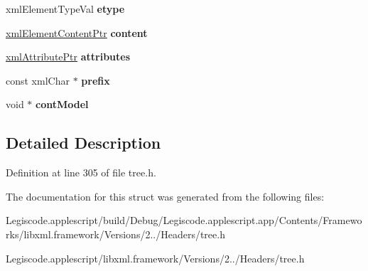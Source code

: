 \begin{DoxyCompactItemize}
\item 
\hypertarget{struct__xml_element_a3f7566085877a63b728c8596438a9540}{xml\-Element\-Type\-Val {\bfseries etype}}\label{struct__xml_element_a3f7566085877a63b728c8596438a9540}

\item 
\hypertarget{struct__xml_element_ac934ce51a0a220c511c1700c3694e0e7}{\hyperlink{struct__xml_element_content}{xml\-Element\-Content\-Ptr} {\bfseries content}}\label{struct__xml_element_ac934ce51a0a220c511c1700c3694e0e7}

\item 
\hypertarget{struct__xml_element_a45468a87059e899da068a6cc04e6a943}{\hyperlink{struct__xml_attribute}{xml\-Attribute\-Ptr} {\bfseries attributes}}\label{struct__xml_element_a45468a87059e899da068a6cc04e6a943}

\item 
\hypertarget{struct__xml_element_a41bb035111f2b0b09a5833e3f63b4bfb}{const xml\-Char $\ast$ {\bfseries prefix}}\label{struct__xml_element_a41bb035111f2b0b09a5833e3f63b4bfb}

\item 
\hypertarget{struct__xml_element_a7a118861be0a195be08732cc67fd7037}{void $\ast$ {\bfseries cont\-Model}}\label{struct__xml_element_a7a118861be0a195be08732cc67fd7037}

\end{DoxyCompactItemize}


\subsection{Detailed Description}


Definition at line 305 of file tree.\-h.



The documentation for this struct was generated from the following files\-:\begin{DoxyCompactItemize}
\item 
Legiscode.\-applescript/build/\-Debug/\-Legiscode.\-applescript.\-app/\-Contents/\-Frameworks/libxml.\-framework/\-Versions/2../\-Headers/tree.\-h\item 
Legiscode.\-applescript/libxml.\-framework/\-Versions/2../\-Headers/tree.\-h\end{DoxyCompactItemize}
